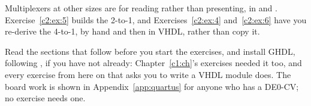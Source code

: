 Multiplexers at other sizes are for reading rather than presenting, in  and
. Exercise~\ref{c2:ex:5} builds the 2-to-1, and Exercises~\ref{c2:ex:4}
and~\ref{c2:ex:6} have you re-derive the 4-to-1, by hand and then in VHDL, rather than copy it.

Read the sections that follow before you start the exercises, and install GHDL, following
, if you have not already: Chapter~\ref{c1:ch}'s exercises needed it too, and
every exercise from here on that asks you to write a VHDL module does. The board work is shown in
Appendix~\ref{app:quartus} for anyone who has a DE0-CV; no exercise needs one.





